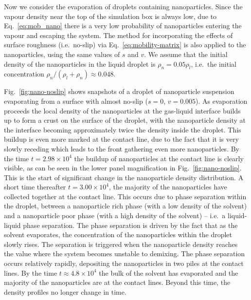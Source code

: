 \documentclass[journal=langd5,manuscript=article]{achemso}
\begin{document}
Now we consider the evaporation of droplets containing nanoparticles.
Since the vapour density near the top of the simulation box is always low,
due to Eq.\ \eqref{eq:mob_nano} there
is a very low probability of nanoparticles entering the vapour and
escaping the system. The method for incorporating the effects of
surface roughness (i.e.\ no-slip) via Eq.~\eqref{eq:mobility-matrix} is
also applied to the nanoparticles,
using the same values of $s$ and $v$. We assume that the initial density
of the nanoparticles in the liquid droplet is $\rho_n=0.05\rho_l$, i.e.\
the initial concentration $\rho_n / (\rho_l+\rho_n) \approx 0.048$.

Fig.~\ref{fig:nano-noslip} shows snapshots of a droplet of nanoparticle
suspension evaporating from a surface with almost no-slip ($s=0$, $v=0.005$). As evaporation proceeds the local density of the nanoparticles at the gas-liquid interface builds up to form a crust on the surface of the droplet, with the nanoparticle density at the interface becoming approximately twice the density inside the droplet. {This buildup is even more marked at the contact line, due to the fact that it is very slowly receding which leads to the front gathering even more nanoparticles.} By the time $t=2.98\times 10^4$ the buildup of nanoparticles at the contact line is clearly visible, as can be seen in {the lower panel magnification in Fig.~\ref{fig:nano-noslip}}. This is the start of significant change in the nanoparticle density distribution. A short time thereafter $t=3.00\times 10^4$, the majority of the nanoparticles have collected together at the contact line. This occurs due to phase separation within the droplet, between a nanoparticle rich phase (with a low density of the solvent) and a nanoparticle poor phase (with a high density of the solvent) -- i.e.\ a liquid-liquid phase separation. The phase separation is driven by the fact that as the solvent evaporates, the concentration of the nanoparticles within the droplet slowly rises. The separation is triggered when the nanoparticle density reaches the value where the system becomes unstable to demixing. The phase separation occurs relatively rapidly, depositing the nanoparticles in two piles at the contact lines. By the time $t\approx4.8 \times 10^4$ the bulk of the solvent has evaporated and the majority of the nanoparticles are at the contact lines. Beyond this time, the density profiles no longer change in time.
\end{document}
